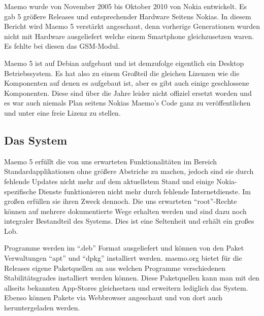 Maemo wurde von November 2005\thinspace\cite{online:maemo1-770} bis Oktober 2010\thinspace\cite{online:maemo5-n900} von Nokia  entwickelt. Es gab 5 größere Releases und entsprechender Hardware Seitens Nokias\thinspace\cite{online:maemo1-770}\thinspace\cite{online:n800-specs}\thinspace\cite{online:n810-specs}\thinspace\cite{online:n900-specs}. In diesem Bericht wird Maemo 5 verstärkt angeschaut, denn vorherige Generationen wurden nicht mit Hardware ausgeliefert welche einem Smartphone gleichzusetzen waren. Es fehlte bei diesen das GSM-Modul.

Maemo 5 ist auf Debian aufgebaut\thinspace\cite{online:maemo-about} und ist demzufolge eigentlich ein Desktop Betriebssystem. Es hat also zu einem Großteil die gleichen Lizenzen wie die Komponenten auf denen es aufgebaut ist, aber es gibt auch einige geschlossene Komponenten\thinspace\cite{online:maemo5-components}. Diese sind über die Jahre leider nicht offiziel ersetzt worden und es war auch niemals Plan seitens Nokias Maemo's Code ganz zu veröffentlichen und unter eine freie Lizenz zu stellen\thinspace\cite{online:maemo-slides}.
\newline

\subsection{Das System}
Maemo 5 erfüllt die von uns erwarteten Funktionalitäten im Bereich Standardapplikationen ohne größere Abstriche zu machen, jedoch sind sie durch fehlende Updates nicht mehr auf dem aktuellstem Stand und einige Nokia-spezifische Dienste funktionieren nicht mehr durch fehlende Internetdienste. Im großen erfüllen sie ihren Zweck dennoch. Die uns erwarteten ``root''-Rechte können auf mehrere dokumentierte Wege erhalten werden und sind dazu noch integraler Bestandteil des Systems\thinspace\cite{online:maemo-root}. Dies ist eine Seltenheit und erhält ein großes Lob.

Programme werden im ``.deb'' Format ausgeliefert und können von den Paket Verwaltungen ``apt'' und ``dpkg'' installiert werden\thinspace\cite{online:maemo-packetinstalling}.
\mbox{maemo.org} bietet für die Releases eigene Paketquellen an aus welchen Programme verschiedenen Stabilitätsgrades installiert werden können\thinspace\cite{online:maemo-extras}. Diese Paketquellen kann man mit den allseits bekannten \mbox{App-Stores} gleichsetzen und erweitern lediglich das System. Ebenso können Pakete via Webbrowser angeschaut und von dort auch heruntergeladen  werden\thinspace\cite{online:maemo-store}\thinspace\cite{online:maemo-rawrepos}.

